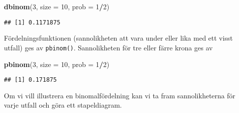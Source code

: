 \documentclass[
]{book}
\newenvironment{Shaded}{\begin{snugshade}}{\end{snugshade}}
\newcommand{\AttributeTok}[1]{\textcolor[rgb]{0.13,0.29,0.53}{#1}}
\newcommand{\DecValTok}[1]{\textcolor[rgb]{0.00,0.00,0.81}{#1}}
\newcommand{\FunctionTok}[1]{\textcolor[rgb]{0.13,0.29,0.53}{\textbf{#1}}}
\newcommand{\NormalTok}[1]{#1}
\newcommand{\SpecialCharTok}[1]{\textcolor[rgb]{0.81,0.36,0.00}{\textbf{#1}}}
\theoremstyle{definition}
\theoremstyle{definition}
\theoremstyle{definition}
\theoremstyle{definition}
\theoremstyle{remark}
\begin{document}
\begin{Shaded}
\begin{Highlighting}[]
\FunctionTok{dbinom}\NormalTok{(}\DecValTok{3}\NormalTok{, }\AttributeTok{size =} \DecValTok{10}\NormalTok{, }\AttributeTok{prob =} \DecValTok{1}\SpecialCharTok{/}\DecValTok{2}\NormalTok{)}
\end{Highlighting}
\end{Shaded}

\begin{verbatim}
## [1] 0.1171875
\end{verbatim}

Fördelningsfunktionen (sannolikheten att vara under eller lika med ett visst utfall) ges av \texttt{pbinom()}. Sannolikheten för tre eller färre krona ges av

\begin{Shaded}
\begin{Highlighting}[]
\FunctionTok{pbinom}\NormalTok{(}\DecValTok{3}\NormalTok{, }\AttributeTok{size =} \DecValTok{10}\NormalTok{, }\AttributeTok{prob =} \DecValTok{1}\SpecialCharTok{/}\DecValTok{2}\NormalTok{)}
\end{Highlighting}
\end{Shaded}

\begin{verbatim}
## [1] 0.171875
\end{verbatim}

Om vi vill illustrera en binomalfördelning kan vi ta fram sannolikheterna för varje utfall och göra ett stapeldiagram.
\end{document}
